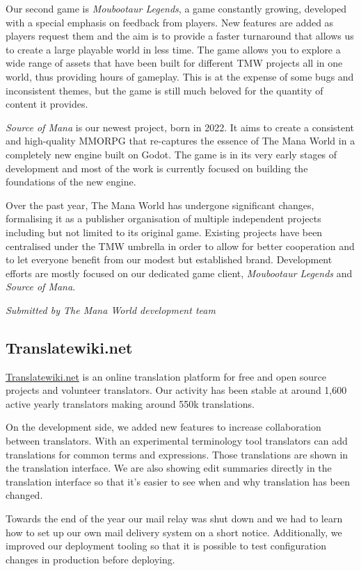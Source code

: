 \documentclass[a4paper]{report}
\begin{document}
Our second game is {\em Moubootaur Legends}, a game constantly growing, developed with a special emphasis on feedback from players. New features are added as players request them and the aim is to provide a faster turnaround that allows us to create a large playable world in less time. The game allows you to explore a wide range of assets that have been built for different TMW projects all in one world, thus providing hours of gameplay. This is at the expense of some bugs and inconsistent themes, but the game is still much beloved for the quantity of content it provides.

{\em Source of Mana} is our newest project, born in 2022. It aims to create a consistent and high-quality MMORPG that re-captures the essence of The Mana World in a completely new engine built on Godot. The game is in its very early stages of development and most of the work is currently focused on building the foundations of the new engine.

Over the past year, The Mana World has undergone significant changes, formalising it as a publisher organisation of multiple independent projects including but not limited to its original game. Existing projects have been centralised under the TMW umbrella in order to allow for better cooperation and to let everyone benefit from our modest but established brand. Development efforts are mostly focused on our dedicated game client, {\em Moubootaur Legends} and {\em Source of Mana}.

{\em Submitted by The Mana World development team}

\subsection{Translatewiki.net}

\href{https://translatewiki.net/}{Translatewiki.net} is an online translation platform for free and open source projects and volunteer translators. Our activity has been stable at around 1,600 active yearly translators making around 550k translations.

On the development side, we added new features to increase collaboration between translators. With an experimental terminology tool translators can add translations for common terms and expressions. Those translations are shown in the translation interface. We are also showing edit summaries
directly in the translation interface so that it's easier to see when and why translation has been changed.

Towards the end of the year our mail relay was shut down and we had to learn how to set up our own mail delivery system on a short notice.  Additionally, we improved our deployment tooling so that it is possible to test configuration changes in production before deploying.
\end{document}
